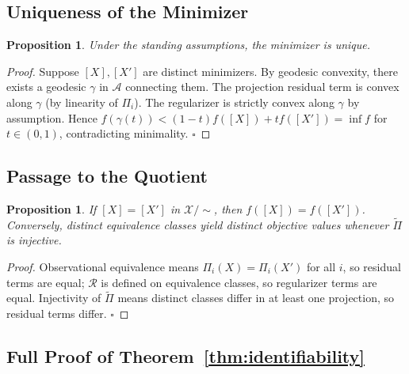 \documentclass[11pt, oneside]{article}
\newtheorem{proposition}[theorem]{Proposition}
\newcommand{\Xmod}{\mathcal{X}/{\sim}}
\newcommand{\Ftil}{\widetilde{\Pi}}
\begin{document}
\subsection{Uniqueness of the Minimizer}

\begin{proposition}
Under the standing assumptions, the minimizer is unique.
\end{proposition}
\begin{proof}
Suppose $[X],[X']$ are distinct minimizers. By geodesic convexity, there exists a
geodesic $\gamma$ in $\mathcal{A}$ connecting them. The projection residual term is
convex along $\gamma$ (by linearity of $\Pi_i$). The regularizer is strictly convex along
$\gamma$ by assumption. Hence $f(\gamma(t)) < (1-t)f([X]) + tf([X']) = \inf f$ for
$t \in (0,1)$, contradicting minimality. $\square$
\end{proof}

\subsection{Passage to the Quotient}

\begin{proposition}
If $[X] = [X']$ in $\Xmod$, then $f([X]) = f([X'])$. Conversely, distinct equivalence
classes yield distinct objective values whenever $\Ftil$ is injective.
\end{proposition}
\begin{proof}
Observational equivalence means $\Pi_i(X) = \Pi_i(X')$ for all $i$, so residual terms
are equal; $\mathcal{R}$ is defined on equivalence classes, so regularizer terms are
equal. Injectivity of $\Ftil$ means distinct classes differ in at least one projection,
so residual terms differ. $\square$
\end{proof}

\subsection{Full Proof of Theorem~\ref{thm:identifiability}}
\end{document}
